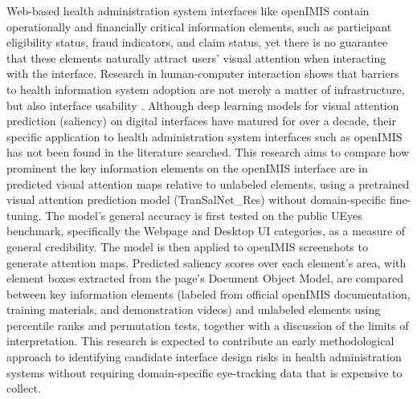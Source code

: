 \documentclass[proposal,indonesia]{ugmskripsi}
\begin{document}
\abstracteng

Web-based health administration system interfaces like openIMIS contain operationally and financially critical information elements, such as participant eligibility status, fraud indicators, and claim status, yet there is no guarantee that these elements naturally attract users' visual attention when interacting with the interface. Research in human-computer interaction shows that barriers to health information system adoption are not merely a matter of infrastructure, but also interface usability \citep{verma2021openmrs,paton2022open}. Although deep learning models for visual attention prediction (saliency) on digital interfaces have matured for over a decade, their specific application to health administration system interfaces such as openIMIS has not been found in the literature searched. This research aims to compare how prominent the key information elements on the openIMIS interface are in predicted visual attention maps relative to unlabeled elements, using a pretrained visual attention prediction model (TranSalNet\_Res) without domain-specific fine-tuning. The model's general accuracy is first tested on the public UEyes benchmark, specifically the Webpage and Desktop UI categories, as a measure of general credibility. The model is then applied to openIMIS screenshots to generate attention maps. Predicted saliency scores over each element's area, with element boxes extracted from the page's Document Object Model, are compared between key information elements (labeled from official openIMIS documentation, training materials, and demonstration videos) and unlabeled elements using percentile ranks and permutation tests, together with a discussion of the limits of interpretation. This research is expected to contribute an early methodological approach to identifying candidate interface design risks in health administration systems without requiring domain-specific eye-tracking data that is expensive to collect.
\endabstracteng






\nocite{*}

\end{document}
